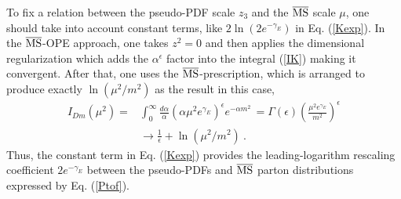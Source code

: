 \documentclass[aps,prd,twocolumn,showpacs,preprintnumbers,superscriptaddress]{revtex4-1}
\newcommand{\nn}{\nonumber \\ }
\begin{document}
To fix a  relation between the pseudo-PDF scale $z_3$  and the $\overline{\rm MS}$ scale $\mu$,
one should take into account constant terms, like $2 \ln (2e^{-  \gamma_E })$  in Eq. (\ref{Kexp}).  
In the $\overline{\rm MS}$-OPE approach,
  one takes $z^2=0$ 
and  then  applies 
 the dimensional regularization which   adds  the  $\alpha^{\epsilon}$ factor into the integral
(\ref{IK}) making it convergent. After that, one    uses the $\overline{\rm MS}$-prescription, 
which is   arranged  to produce  exactly
 $\ln (\mu^2/m^2)$ as the result in this case, 
    \begin{align} 
  I_{Dm} (\mu^2) =& \int_0^\infty \frac{d\alpha}{\alpha}  (\alpha \mu^2 e^{\gamma_E})^{\epsilon}  e^{-   \alpha m^2} \,
  =\Gamma (\epsilon) \left ( \frac{\mu^2 e^{\gamma_E}}{m^2} \right )^\epsilon \nn & \to 
  \frac1{\epsilon}   + \ln (\mu^2/m^2)  \  . 
  \label{ImM}
     \end{align} 
 Thus,  the constant  term in Eq. (\ref{Kexp}) 
provides the leading-logarithm rescaling coefficient 
$2e^{-  \gamma_E}$  between the pseudo-PDFs and $\overline{\rm MS}$ parton distributions
expressed by Eq. (\ref{Ptof}). 
\end{document}
